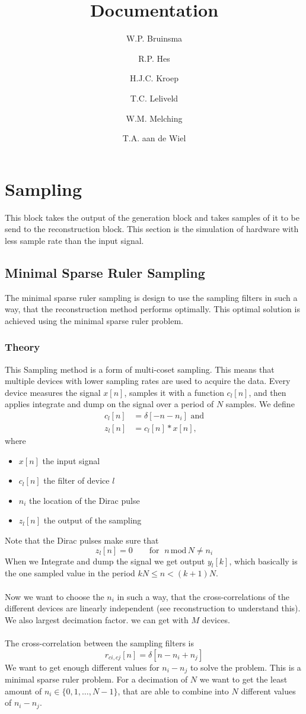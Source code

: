 \documentclass[report, oneside, a4paper, openany]{memoir}
\title{Documentation}
\author{W.P. Bruinsma \and R.P. Hes \and H.J.C. Kroep \and T.C. Leliveld \and W.M. Melching \and T.A. aan de Wiel}
\begin{document}
\chapter{Sampling}
This block takes the output of the generation block and takes samples of it to be send to the reconstruction block. 
This section is the simulation of hardware with less sample rate than the input signal.


\section{Minimal Sparse Ruler Sampling}
The minimal sparse ruler sampling is design to use the sampling filters in such a way, that the reconstruction method performs optimally. This optimal solution is achieved using the minimal sparse ruler problem.
\subsection{Theory}
This Sampling method is a form of multi-coset sampling. This means that multiple devices with lower sampling rates are used to acquire the data. Every device measures the signal $x[n]$, samples it with a function $c_l[n]$, and then applies integrate and dump on the signal over a period of $N$ samples. We define 
\begin{align}
c_l[n] &= \delta[-n -n_i] \text{ and}\\
z_l[n] &= c_l[n]\ast x[n],
\end{align}
where
\begin{itemize}
\item $x[n]$ the input signal
\item $c_l[n]$ the filter of device $l$
\item $n_i$ the location of the Dirac pulse
\item $z_l[n]$ the output of the sampling
\end{itemize}
Note that the Dirac pulses make sure that
$$z_l[n]=0 \quad \quad \text{for }\;n\,\text{mod}\,N\neq n_i$$
When we Integrate and dump the signal we get output $y_l[k]$, which basically is the one sampled value in the period $kN\leq n<(k+1)N$.\\
\\
Now we want to choose the $n_i$ in such a way, that the cross-correlations of the different devices are linearly independent (see reconstruction to understand this). We also largest decimation factor. we can get with $M$ devices.\\
\\
The cross-correlation between the sampling filters is 
$$
r_{ci,cj}[n] = \delta [n-n_i+n_j]
$$
We want to get enough different values for $n_i-n_j$ to solve the problem. This is a minimal sparse ruler problem. For a decimation of $N$ we want to get the least amount of $n_i \in \{0,1,\dots,N-1\}$, that are able to combine into $N$ different values of $n_i-n_j$. 
\end{document}
